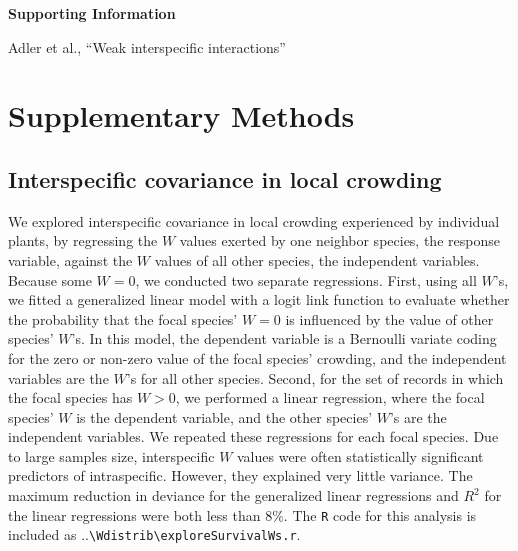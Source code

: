 \documentclass[11pt]{article}
\begin{document}

\clearpage 
\newpage 

\setcounter{page}{1}
\setcounter{equation}{0}
\setcounter{figure}{0}
\setcounter{section}{0}
\setcounter{table}{0}
\renewcommand{\theequation}{SI.\arabic{equation}}
\renewcommand{\thetable}{SI-\arabic{table}}
\renewcommand{\thefigure}{SI-\arabic{figure}}
\renewcommand{\thesection}{Section SI.\arabic{section}}

\centerline{\Large \textbf{Supporting Information }}
\centerline{Adler et al., ``Weak interspecific interactions''} 

\vspace{0.4in} 

\section{Supplementary Methods} \label{suppMethods}

\subsection{Interspecific covariance in local crowding} 
We explored interspecific covariance in local crowding experienced by individual plants, by regressing the $W$ values exerted by one neighbor species, the response variable, against the $W$ values of all other species, the independent variables. Because some $W=0$, we conducted two separate regressions. First, using all $W$'s, we fitted a generalized linear model with a logit link function to evaluate whether the probability that the focal species' $W=0$ is influenced by the value of other species' $W$'s. In this model, the dependent variable is a Bernoulli variate coding for the zero or non-zero value of the focal species' crowding, and the independent variables are the $W$'s for all other species. Second, for the set of records in which the focal species has $W>0$, we performed a linear regression, where the focal species' $W$ is the dependent variable, and the other species' $W$'s are the independent variables. We repeated these regressions for each focal species. Due to large samples size, interspecific $W$ values were often statistically significant predictors of intraspecific. However, they explained very little variance. The maximum reduction in deviance for the generalized linear regressions and $R^2$ for the linear regressions were both less than 8\%. The \texttt{R} code for this analysis is included as ..\texttt{\textbackslash Wdistrib\textbackslash exploreSurvivalWs.r}.
\end{document}

